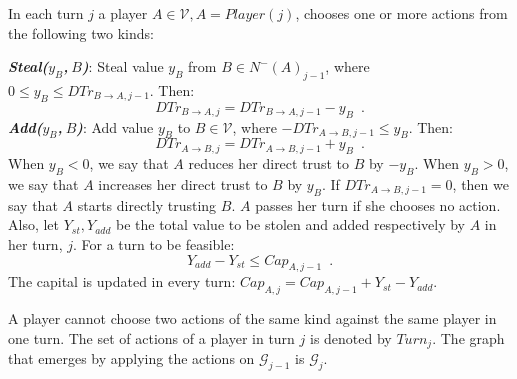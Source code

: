\begin{definition}[Turns]
  In each turn $j$ a player $A \in \mathcal{V}, A = Player\left(j\right)$, chooses one or more actions from the following two
  kinds:

  \noindent \textit{\textbf{Steal($y_B$,$\:B$)}}: Steal value $y_B$ from $B \in N^{-}\left(A\right)_{j-1}$, where
  $0 \leq y_B \leq DTr_{B \rightarrow A, j-1}$. Then:
  \begin{equation*}
     DTr_{B \rightarrow A, j} = DTr_{B \rightarrow A, j-1} - y_B \enspace.
  \end{equation*}
  \noindent \textit{\textbf{Add($y_B$,$\:B$)}}:
  Add value $y_B$ to $B \in \mathcal{V}$, where $-DTr_{A \rightarrow B, j-1} \leq y_B$. Then:
  \begin{equation*}
     DTr_{A \rightarrow B, j} = DTr_{A \rightarrow B, j-1} + y_B \enspace.
  \end{equation*}
  When $y_B < 0$, we say that $A$ reduces her direct trust to $B$ by $-y_B$. When $y_B > 0$, we say that $A$ increases her
  direct trust to $B$ by $y_B$. If $DTr_{A \rightarrow B, j-1} = 0$, then we say that $A$ starts directly trusting $B$.
  $A$ passes her turn if she chooses no action. Also, let $Y_{st}, Y_{add}$ be the
  total value to be stolen and added respectively by $A$ in her turn, $j$. For a turn to be feasible:
  \begin{equation}
     Y_{add} - Y_{st} \leq Cap_{A, j-1} \enspace.
  \end{equation}
  The capital is updated in every turn: $Cap_{A, j} = Cap_{A, j-1} + Y_{st} - Y_{add}$.

  A player cannot choose two actions of the same kind against the same player in one turn.
  The set of actions of a player in turn $j$ is denoted by $Turn_j$. The graph that emerges by applying
  the actions on $\mathcal{G}_{j-1}$ is $\mathcal{G}_j$.
\end{definition}
